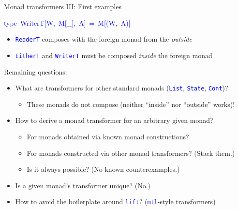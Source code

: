 \documentclass[english]{beamer}
\newenvironment{lyxcode}
  {\par\begin{list}{}{
    \setlength{\rightmargin}{\leftmargin}
    \setlength{\listparindent}{0pt}%
    \raggedright
    \setlength{\itemsep}{0pt}
    \setlength{\parsep}{0pt}
    \normalfont\ttfamily}%
   \def\{{\char`\{}
   \def\}{\char`\}}
   \def\textasciitilde{\char`\~}
   \item[]}
  {\end{list}}
\begin{document}
\begin{frame}{Monad transformers III: First examples}
\begin{lyxcode}
\textcolor{blue}{\footnotesize{}type~WriterT{[}W,~M{[}\_{]},~A{]}~=~M{[}(W,~A){]}}{\footnotesize\par}
\end{lyxcode}
\begin{itemize}
\item {\footnotesize{}\vspace{-0.2cm}}\texttt{\textcolor{blue}{\footnotesize{}ReaderT}}
composes with the foreign monad from the \emph{outside}
\item \texttt{\textcolor{blue}{\footnotesize{}EitherT}} and \texttt{\textcolor{blue}{\footnotesize{}WriterT}}
must be composed \emph{inside} the foreign monad
\end{itemize}
{\footnotesize{}\vspace{-0.1cm}}Remaining questions:
\begin{itemize}
\item What are transformers for other standard monads (\texttt{\textcolor{blue}{\footnotesize{}List}},
\texttt{\textcolor{blue}{\footnotesize{}State}}, \texttt{\textcolor{blue}{\footnotesize{}Cont}})?
\begin{itemize}
\item These monads do not compose (neither ``inside'' nor ``outside''
works)!
\end{itemize}
\item How to derive a monad transformer for an arbitrary given monad?
\begin{itemize}
\item For monads obtained via known monad constructions?
\item For monads constructed via other monad transformers? (Stack them.)
\item Is it always possible? (No known counterexamples.)
\end{itemize}
\item Is a given monad's transformer unique? (No.)
\item How to avoid the boilerplate around \texttt{\textcolor{blue}{\footnotesize{}lift}}?
(\texttt{\textcolor{blue}{\footnotesize{}mtl}}-style transformers)
\end{itemize}
\end{frame}
\end{document}
